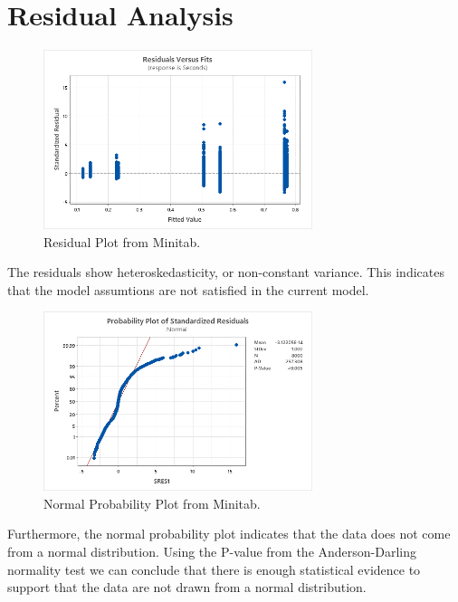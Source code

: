 \documentclass{article}
\begin{document}
\section{Residual Analysis}
  \begin{figure}[h] %
    \centering
    \includegraphics[width=0.7\textwidth]{./images/residuals.png}
    \caption{Residual Plot from Minitab.}
    \label{fig:interaction}
  \end{figure}
  The residuals show heteroskedasticity, or non-constant variance.
  This indicates that the model assumtions are not satisfied in the current model. \\

  \begin{figure}[h] %
    \centering
    \includegraphics[width=0.7\textwidth]{./images/normal.png}
    \caption{Normal Probability Plot from Minitab.}
    \label{fig:interaction}
  \end{figure}

  Furthermore, the normal probability plot indicates that the data does not come from a normal distribution.
  Using the P-value from the Anderson-Darling normality test we can conclude that there is enough statistical evidence to support that the data are not drawn from a normal distribution.
\end{document}
